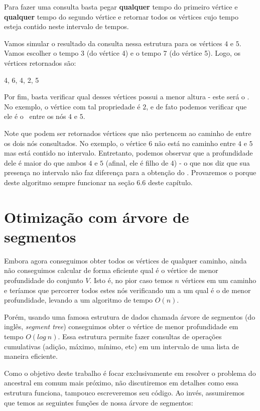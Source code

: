 Para fazer uma consulta basta pegar \textbf{qualquer} tempo do primeiro vértice e \textbf{qualquer} tempo do segundo vértice e retornar todos os vértices cujo tempo esteja contido neste intervalo de tempos.

Vamos simular o resultado da consulta nessa estrutura para os vértices $4$ e $5$. Vamos escolher o tempo 3 (do vértice 4) e o tempo 7 (do vértice 5). Logo, os vértices retornados são:



\begin{center}
    4, 6, 4, 2, 5    
\end{center}

Por fim, basta verificar qual desses vértices possui a menor altura - este será o \LCA. No exemplo, o vértice com tal propriedade é $2$, e de fato podemos verificar que ele é o \LCA\ entre os nós $4$ e $5$.

Note que podem ser retornados vértices que não pertencem ao caminho de entre os dois nós consultados. No exemplo, o vértice $6$ não está no caminho entre $4$ e $5$ mas está contido no intervalo. Entretanto, podemos observar que a profundidade dele é maior do que ambos $4$ e $5$ (afinal, ele é filho de $4$) - o que nos diz que sua presença no intervalo não faz diferença para a obtenção do \LCA. Provaremos o porque deste algoritmo sempre funcionar na seção 6.6 deste capítulo.

\section{Otimização com árvore de segmentos}

Embora agora conseguimos obter todos os vértices de qualquer caminho, ainda não conseguimos calcular de forma eficiente qual é o vértice de menor profundidade do conjunto $V$. Isto é, no pior caso temos $n$ vértices em um caminho e teríamos que percorrer todos estes nós verificando um a um qual é o de menor profundidade, levando a um algoritmo de tempo $O(n)$.

Porém, usando uma famosa estrutura de dados chamada árvore de segmentos \cite{arvore-segmentos} (do inglês, \textit{segment tree}) conseguimos obter o vértice de menor profundidade em tempo $O(log\ n)$. Essa estrutura permite fazer consultas de operações cumulativas (adição, máximo, mínimo, etc) em um intervalo de uma lista de maneira eficiente.

Como o objetivo deste trabalho é focar exclusivamente em resolver o problema do ancestral em comum mais próximo, não discutiremos em detalhes como essa estrutura funciona, tampouco escreveremos seu código. Ao invés, assumiremos que temos as seguintes funções de nossa árvore de segmentos:

